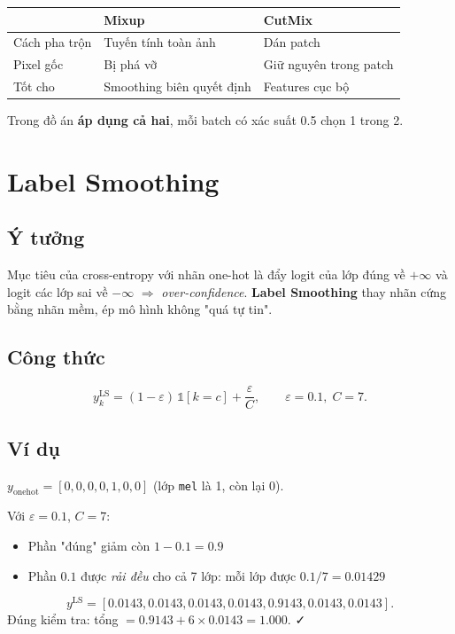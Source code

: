 \documentclass[11pt,a4paper]{article}
\begin{document}
\begin{table}[h]
\centering\small
\begin{tabular}{lll}
\toprule
& \textbf{Mixup} & \textbf{CutMix} \\
\midrule
Cách pha trộn  & Tuyến tính toàn ảnh   & Dán patch \\
Pixel gốc      & Bị phá vỡ              & Giữ nguyên trong patch \\
Tốt cho        & Smoothing biên quyết định & Features cục bộ \\
\bottomrule
\end{tabular}
\end{table}

Trong đồ án \textbf{áp dụng cả hai}, mỗi batch có xác suất 0.5 chọn 1 trong 2.

\section{Label Smoothing}

\subsection{Ý tưởng}

Mục tiêu của cross-entropy với nhãn one-hot là đẩy logit của lớp đúng về $+\infty$ và logit các lớp sai về $-\infty$ $\Rightarrow$ \textit{over-confidence}. \textbf{Label Smoothing} thay nhãn cứng bằng nhãn mềm, ép mô hình không "quá tự tin".

\subsection{Công thức}

\[
  y^{\text{LS}}_k = (1 - \varepsilon) \, \mathbb{1}[k = c] + \frac{\varepsilon}{C}, \qquad \varepsilon = 0.1, \; C = 7.
\]

\subsection{Ví dụ}

\begin{example}
$y_{\text{onehot}} = [0, 0, 0, 0, 1, 0, 0]$ (lớp \texttt{mel} là 1, còn lại 0).

Với $\varepsilon = 0.1$, $C = 7$:
\begin{itemize}[leftmargin=*]
  \item Phần "đúng" giảm còn $1 - 0.1 = 0.9$
  \item Phần $0.1$ được \textit{rải đều} cho cả 7 lớp: mỗi lớp được $0.1 / 7 = 0.01429$
\end{itemize}
\[
  y^{\text{LS}} = [\mathbf{0.0143}, 0.0143, 0.0143, 0.0143, \mathbf{0.9143}, 0.0143, 0.0143].
\]
Đúng kiểm tra: tổng $= 0.9143 + 6 \times 0.0143 = 1.000$. ✓
\end{example}
\end{document}
